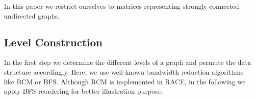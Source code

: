In this paper we restrict ourselves to matrices representing strongly connected 
undirected graphs.

\subsection{Level Construction}
In the first step we determine the different levels of a graph and permute the data structure accordingly.
Here, we  use well-known bandwidth reduction algorithms like \Acrfull{RCM}\cite{RCM}
or \Acrfull{BFS}\cite{BFS}. Although \acrshort{RCM} is implemented in \acrshort{RACE},
in the following we apply \acrshort{BFS} reordering for better illustration purpose.
\begin{figure}[tb]
\end{figure}
